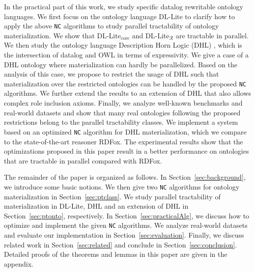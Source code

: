 In the practical part of this work, we study specific datalog rewritable ontology languages.
We first focus on the ontology language DL-Lite \cite{CalvaneseGLLR07} to clarify how to apply the above \texttt{NC} algorithms
to study parallel tractability of ontology materialization.
We show that DL-Lite$_{\text{core}}$ and DL-Lite$_\mathcal{R}$ are tractable in parallel.
We then study the ontology language Description Horn Logic (DHL) \cite{GrosofHVD03}, which is the intersection of datalog and OWL
in terms of expressivity. We give a case of a DHL ontology where materialization can hardly be parallelized.
Based on the analysis of this case, we propose to restrict the usage of DHL such that materialization over the
restricted ontologies can be handled by the proposed \texttt{NC} algorithms.
We further extend the results to an extension of DHL that also allows complex role inclusion axioms.
Finally, we analyze well-known benchmarks and real-world datasets and show that many real ontologies following the
proposed restrictions belong to the parallel tractability classes.
We implement a system based on an optimized \texttt{NC} algorithm for DHL materialization, which we compare to the state-of-the-art reasoner RDFox.
The experimental results show that the optimizations proposed in this paper result in a better performance on ontologies that are 
tractable in parallel compared with RDFox.

The remainder of the paper is organized as follows. In Section~\ref{sec:background}, we introduce some basic notions.
We then give two \texttt{NC} algorithms for ontology materialization in Section~\ref{sec:ptclass}.
We study parallel tractability of materialization in DL-Lite, DHL and an extension of DHL in Section~\ref{sec:ptonto}, respectively.
In Section~\ref{sec:practicalAlg},
we discuss how to optimize and implement the given \texttt{NC} algorithms.
We analyze real-world datasets and evaluate our implementation in Section~\ref{sec:evaluation}.
Finally, we discuss related work in Section~\ref{sec:related} and conclude in Section~\ref{sec:conclusion}. Detailed proofs of the theorems and lemmas in this paper are given in the appendix.



